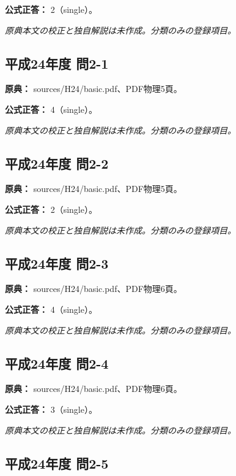 \textbf{公式正答：} 2（single）。

\par\textit{原典本文の校正と独自解説は未作成。分類のみの登録項目。}

\subsection{平成24年度 問2-1}
\label{q:h24-reg-basic-2-1}

\noindent\textbf{原典：} sources/H24/basic.pdf、PDF物理5頁。

\textbf{公式正答：} 4（single）。

\par\textit{原典本文の校正と独自解説は未作成。分類のみの登録項目。}

\subsection{平成24年度 問2-2}
\label{q:h24-reg-basic-2-2}

\noindent\textbf{原典：} sources/H24/basic.pdf、PDF物理5頁。

\textbf{公式正答：} 2（single）。

\par\textit{原典本文の校正と独自解説は未作成。分類のみの登録項目。}

\subsection{平成24年度 問2-3}
\label{q:h24-reg-basic-2-3}

\noindent\textbf{原典：} sources/H24/basic.pdf、PDF物理6頁。

\textbf{公式正答：} 4（single）。

\par\textit{原典本文の校正と独自解説は未作成。分類のみの登録項目。}

\subsection{平成24年度 問2-4}
\label{q:h24-reg-basic-2-4}

\noindent\textbf{原典：} sources/H24/basic.pdf、PDF物理6頁。

\textbf{公式正答：} 3（single）。

\par\textit{原典本文の校正と独自解説は未作成。分類のみの登録項目。}

\subsection{平成24年度 問2-5}
\label{q:h24-reg-basic-2-5}

